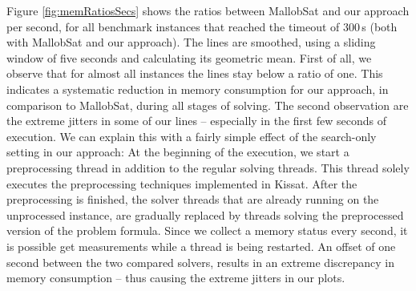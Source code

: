 \documentclass[12pt,a4paper,twoside]{scrartcl}
\numberwithin{equation}{section}
\begin{document}
Figure \ref{fig:memRatiosSecs} shows the ratios between MallobSat and our approach per second, for all benchmark instances that reached the timeout of $300\,$s (both with MallobSat and our approach). The lines are smoothed, using a sliding window of five seconds and calculating its geometric mean.
First of all, we observe that for almost all instances the lines stay below a ratio of one. This indicates a systematic reduction in memory consumption for our approach, in comparison to MallobSat, during all stages of solving.
The second observation are the extreme jitters in some of our lines -- especially in the first few seconds of execution. We can explain this with a fairly simple effect of the search-only setting in our approach: At the beginning of the execution, we start a preprocessing thread in addition to the regular solving threads. This thread solely executes the preprocessing techniques implemented in Kissat. After the preprocessing is finished, the solver threads that are already running on the unprocessed instance, are gradually replaced by threads solving the preprocessed version of the problem formula. Since we collect a memory status every second, it is possible get measurements while a thread is being restarted. An offset of one second between the two compared solvers, results in an extreme discrepancy in memory consumption -- thus causing the extreme jitters in our plots.
\end{document}
